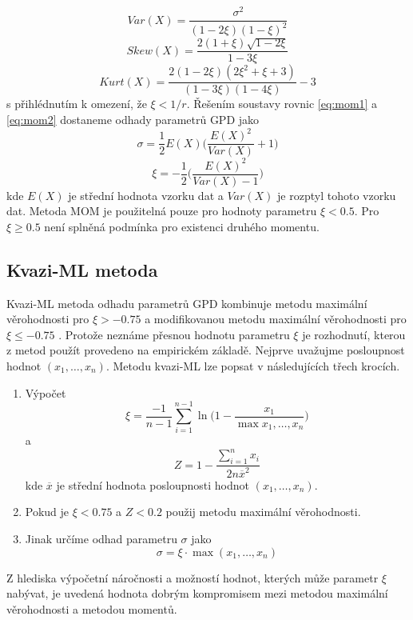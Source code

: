 \begin{equation}\label{eq:mom2}
Var(X)=\frac{\sigma^2}{(1-2\xi)(1-\xi)^2}
\end{equation}
\begin{equation}\label{eq:mom3}
Skew(X)=\frac{2(1+\xi)\sqrt{1-2\xi}}{1-3\xi}
\end{equation}
\begin{equation}
Kurt(X)=\frac{2(1-2\xi)(2\xi^2+\xi+3)}{(1-3\xi)(1-4\xi)}-3
\end{equation}
s přihlédnutím k omezení, že $\xi < 1/r$. Řešením soustavy rovnic \ref{eq:mom1} a \ref{eq:mom2} dostaneme odhady parametrů GPD jako
\begin{equation}
\sigma=\frac{1}{2}E(X)\Bigg(\frac{E(X)^2}{Var(X)}+1\Bigg)
\end{equation}
\begin{equation}
\xi=-\frac{1}{2}\Bigg(\frac{E(X)^2}{Var(X)-1}\Bigg)
\end{equation}
kde $E(X)$ je střední hodnota vzorku dat a $Var(X)$ je rozptyl tohoto vzorku dat. Metoda MOM je použitelná pouze pro hodnoty parametru $\xi < 0.5$. Pro $\xi \geq 0.5$ není splněná podmínka pro existenci druhého momentu. 

\subsection{Kvazi-ML metoda}
Kvazi-ML metoda  odhadu parametrů GPD kombinuje metodu maximální věrohodnosti pro $\xi > -0.75$ a modifikovanou metodu maximální věrohodnosti pro $\xi \leq -0.75$ \cite{Luceno}. Protože neznáme přesnou hodnotu parametru $\xi$ je rozhodnutí, kterou z metod použít provedeno na empirickém základě. Nejprve uvažujme posloupnost hodnot $(x_1,\dots, x_n)$. Metodu kvazi-ML lze popsat v následujících třech krocích.
\begin{enumerate}
\item Výpočet
\begin{equation}
\xi=\frac{-1}{n-1}\sum_{i=1}^{n-1} \ln \Big(1-\frac{x_1}{\max{x_1,\dots,x_n}}\Big)
\end{equation}
a
\begin{equation}
Z=1-\frac{\sum_{i=1}^n x_i}{2 n\overline{x}^2}
\end{equation}
kde $\overline{x}$ je střední hodnota posloupnosti hodnot $(x_1,\dots, x_n)$.
\item Pokud je $\xi<0.75$ a  $Z < 0.2$ použij metodu maximální věrohodnosti. 
\item Jinak určíme odhad parametru $\sigma$ jako
\begin{equation}
\sigma=\xi \cdot \max{(x_1,\dots,x_n)}
\end{equation}

\end{enumerate}
Z hlediska výpočetní náročnosti a možností hodnot, kterých může parametr $\xi$ nabývat, je uvedená hodnota dobrým kompromisem mezi metodou maximální věrohodnosti a metodou momentů.